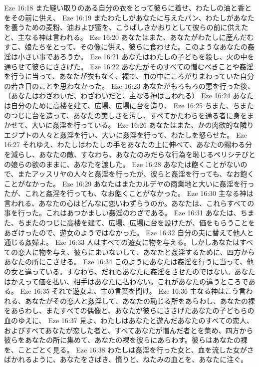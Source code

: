 Eze 16:18  また縫い取りのある自分の衣をとって彼らに着せ、わたしの油と香とをその前に供え、
Eze 16:19  またわたしがあなたに与えたパン、わたしがあなたを養うための麦粉、油および蜜を、こうばしきかおりとして彼らの前に供えたと、主なる神は言われる。
Eze 16:20  あなたはまた、あなたがわたしに産んだむすこ、娘たちをとって、その像に供え、彼らに食わせた。このようなあなたの姦淫は小さい事であろうか。
Eze 16:21  あなたはわたしの子どもを殺し、火の中を通らせて彼らにささげた。
Eze 16:22  あなたがそのすべての憎むべきことや姦淫を行うに当って、あなたが衣もなく、裸で、血の中にころがりまわっていた自分の若き日のことを思わなかった。
Eze 16:23  あなたがもろもろの悪を行った後、（あなたはわざわいだ、わざわいだと、主なる神は言われる）
Eze 16:24  あなたは自分のために高楼を建て、広場、広場に台を造り、
Eze 16:25  ちまた、ちまたのつじに台を造って、あなたの美しさを汚し、すべてかたわらを通る者に身をまかせて、大いに姦淫を行っている。
Eze 16:26  あなたはまた、かの肉欲的な隣りエジプトの人々と姦淫を行い、大いに姦淫を行って、わたしを怒らせた。
Eze 16:27  それゆえ、わたしはわたしの手をあなたの上に伸べて、あなたの賜わる分を減らし、あなたの敵、すなわち、あなたのみだらな行為を恥じるペリシテびとの娘らの欲のままに、あなたを渡した。
Eze 16:28  あなたは飽くことがないので、またアッスリヤの人々と姦淫を行ったが、彼らと姦淫を行っても、なお飽くことがなかった。
Eze 16:29  あなたはまたカルデヤの商業地と大いに姦淫を行ったが、これと姦淫を行っても、なお飽くことがなかった。
Eze 16:30  主なる神は言われる、あなたの心はどんなに恋いわずらうのか。あなたは、これらすべての事を行った。これはあつかましい姦淫のわざである。
Eze 16:31  あなたは、ちまた、ちまたのつじに高楼を建て、広場、広場に台を設けたが、価をもらうことをあざけったので、遊女のようではなかった。
Eze 16:32  自分の夫に替えて他人と通じる姦婦よ。
Eze 16:33  人はすべての遊女に物を与える。しかしあなたはすべての恋人に物を与え、彼らにまいないして、あなたと姦淫するために、四方からあなたの所にこさせる。
Eze 16:34  このようにあなたは姦淫を行うに当って、他の女と違っている。すなわち、だれもあなたに姦淫をさせたのではない。あなたはかえって価を払い、相手はあなたに払わない。これがあなたの違うところである。
Eze 16:35  それで遊女よ、主の言葉を聞け。
Eze 16:36  主なる神はこう言われる、あなたがその恋人と姦淫して、あなたの恥じる所をあらわし、あなたの裸をあらわし、またすべての偶像と、あなたが彼らにささげたあなたの子どもらの血のゆえに、
Eze 16:37  見よ、わたしはあなたと遊んだあなたのすべての恋人、およびすべてあなたが恋した者と、すべてあなたが憎んだ者とを集め、四方から彼らをあなたの所に集めて、あなたの裸を彼らにあらわす。彼らはあなたの裸を、ことごとく見る。
Eze 16:38  わたしは姦淫を行った女と、血を流した女がさばかれるように、あなたをさばき、憤りと、ねたみの血とを、あなたに注ぐ。
